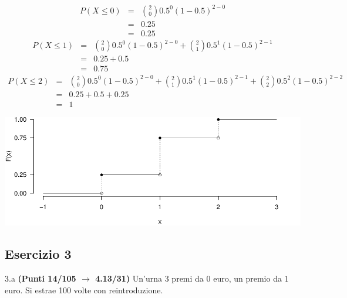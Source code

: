 \documentclass[
  11pt,
]{book}
\theoremstyle{mytheoremstyle}
\theoremstyle{mydefstyle}
\newenvironment{sol}
  {
  \begin{tcolorbox}[enhanced,breakable,arc=0.1mm,boxrule=1pt,colback=white,colframe=iblue,
  title=\bf \fontfamily{lmss}\selectfont \hspace{.5 cm} Soluzione,drop fuzzy shadow]

}{
\end{tcolorbox}
  }
\begin{document}
\begin{sol}

\normalsize 
\begin{eqnarray*}
      P( X \leq 0 ) &=& \binom{ 2 }{ 0 } 0.5 ^{ 0 }(1- 0.5 )^{ 2 - 0 } \\                 &=& 0.25 \\                 &=& 0.25 
   \end{eqnarray*}
\normalsize  \normalsize 
\begin{eqnarray*}
      P( X \leq 1 ) &=& \binom{ 2 }{ 0 } 0.5 ^{ 0 }(1- 0.5 )^{ 2 - 0 }+\binom{ 2 }{ 1 } 0.5 ^{ 1 }(1- 0.5 )^{ 2 - 1 } \\                 &=& 0.25+0.5 \\                 &=& 0.75 
   \end{eqnarray*}
\normalsize  \normalsize 
\begin{eqnarray*}
      P( X \leq 2 ) &=& \binom{ 2 }{ 0 } 0.5 ^{ 0 }(1- 0.5 )^{ 2 - 0 }+\binom{ 2 }{ 1 } 0.5 ^{ 1 }(1- 0.5 )^{ 2 - 1 }+\binom{ 2 }{ 2 } 0.5 ^{ 2 }(1- 0.5 )^{ 2 - 2 } \\                 &=& 0.25+0.5+0.25 \\                 &=& 1 
   \end{eqnarray*}
\normalsize 

\begin{center}\includegraphics{Esami_passati_con_soluzioni_files/figure-latex/2024-97-1} \end{center}

\end{sol}

\subsection{Esercizio 3}\label{esercizio-3-39}

3.a \textbf{(Punti 14/105 \(\rightarrow\) 4.13/31)} Un'urna 3 premi da \(\mbox{0}\) euro, un premio da \(\mbox{1}\) euro.
Si estrae 100 volte con reintroduzione.
\end{document}
